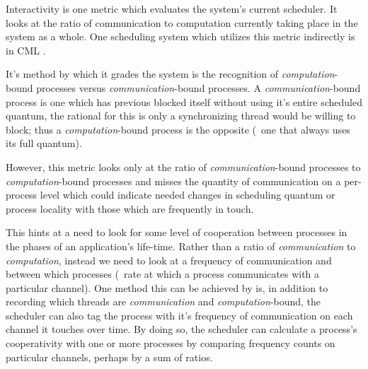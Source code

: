 Interactivity is one metric which evaluates the system's current scheduler. It looks at the ratio of communication
to computation currently taking place in the system as a whole. One scheduling system which utilizes this metric 
indirectly is in CML \cite{reppy1993concurrent}.

It's method by which it grades the system is the recognition of {\em computation}-bound processes versus
{\em communication}-bound processes. A {\em communication}-bound process is one which has previous blocked itself
without using it's entire scheduled quantum, the rational for this is only a synchronizing thread would be willing
to block; thus a {\em computation}-bound process is the opposite (\ie~one that always uses its full quantum). 

However, this metric looks only at the ratio of {\em communication}-bound processes to {\em computation}-bound
processes and misses the quantity of communication on a per-process level which could indicate needed changes in
scheduling quantum or process locality with those which are frequently in touch.

This hints at a need to look for some level of cooperation between processes in the phases of an application's
life-time. Rather than a ratio of {\em communication} to {\em computation}, instead we need to look at a 
frequency of communication and between which processes (\ie~rate at which a process communicates with a particular
channel). One method this can be achieved by is, in addition to recording which threads are {\em communication} and 
{\em computation}-bound, the scheduler can also tag the process with it's frequency of communication on each 
channel it touches over time. By doing so, the scheduler can calculate a process's cooperativity with one or more
processes by comparing frequency counts on particular channels, perhaps by a sum of ratios.



